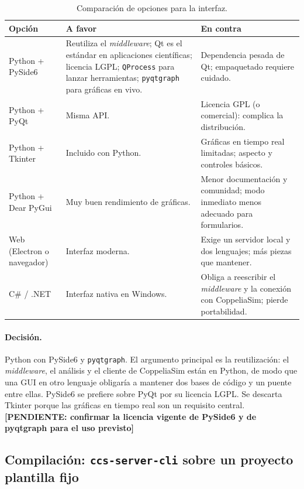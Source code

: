 \documentclass[12pt,letterpaper]{article}
\newcommand{\pendiente}[1]{\textbf{[PENDIENTE: #1]}}
\begin{document}
\begin{table}[!htbp]
\centering
\caption{Comparación de opciones para la interfaz.}
\label{tab:lenguaje}
\begin{tabularx}{\textwidth}{>{\raggedright\arraybackslash}p{2.6cm}YY}
\toprule
\textbf{Opción} & \textbf{A favor} & \textbf{En contra} \\
\midrule
Python + PySide6 & Reutiliza el \textit{middleware}; Qt es el estándar en aplicaciones científicas; licencia LGPL; \texttt{QProcess} para lanzar herramientas; \texttt{pyqtgraph} para gráficas en vivo. & Dependencia pesada de Qt; empaquetado requiere cuidado. \\
Python + PyQt & Misma API. & Licencia GPL (o comercial): complica la distribución. \\
Python + Tkinter & Incluido con Python. & Gráficas en tiempo real limitadas; aspecto y controles básicos. \\
Python + Dear PyGui & Muy buen rendimiento de gráficas. & Menor documentación y comunidad; modo inmediato menos adecuado para formularios. \\
Web (Electron o navegador) & Interfaz moderna. & Exige un servidor local y dos lenguajes; más piezas que mantener. \\
C\# / .NET & Interfaz nativa en Windows. & Obliga a reescribir el \textit{middleware} y la conexión con CoppeliaSim; pierde portabilidad. \\
\bottomrule
\end{tabularx}
\end{table}

\paragraph{Decisión.} Python con PySide6 y \texttt{pyqtgraph}. El argumento principal es la reutilización: el \textit{middleware}, el análisis y el cliente de CoppeliaSim están en Python, de modo que una GUI en otro lenguaje obligaría a mantener dos bases de código y un puente entre ellas. PySide6 se prefiere sobre PyQt por su licencia LGPL. Se descarta Tkinter porque las gráficas en tiempo real son un requisito central. \pendiente{confirmar la licencia vigente de PySide6 y de pyqtgraph para el uso previsto}

\subsection{Compilación: \texttt{ccs-server-cli} sobre un proyecto plantilla fijo}
\label{sec:dec_build}
\end{document}
